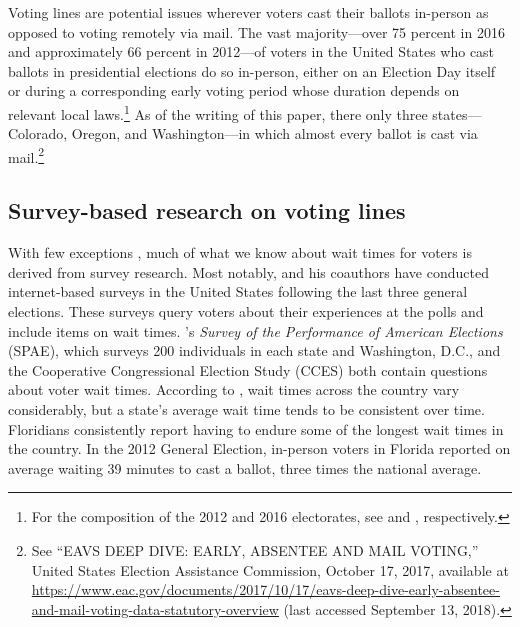 \documentclass[12pt,titlepage]{article}
\begin{document}
Voting lines are potential issues wherever voters cast their ballots
in-person as opposed to voting remotely via mail.  The vast
majority---over 75 percent in 2016 and approximately 66 percent in
2012---of voters in the United States who cast ballots in presidential
elections do so in-person, either on an Election Day itself or during
a corresponding early voting period whose duration depends on relevant
local laws.\footnote{For the composition of the 2012 and 2016
  electorates, see \citet{eac:2012} and \citet{eac:2016},
  respectively.}  As of the writing of this paper, there only three
states---Colorado, Oregon, and Washington---in which almost every
ballot is cast via mail.\footnote{See ``EAVS DEEP DIVE: EARLY,
  ABSENTEE AND MAIL VOTING,'' United States Election Assistance
  Commission, October 17, 2017, available at
  \url{https://www.eac.gov/documents/2017/10/17/eavs-deep-dive-early-absentee-and-mail-voting-data-statutory-overview}
  (last accessed September 13, 2018).}


\subsection*{Survey-based research on voting lines}


With few exceptions \citep[e.g.,][]{spencermarkovits:renege,
  herronsmith:hanoverstudy, pettigrew:longlinesminorityprecincts},
much of what we know about wait times for voters is derived from
survey research.  Most notably, \citet{stewart:waitingtovote2012} and
his coauthors have conducted internet-based surveys in the United
States following the last three general elections.  These surveys
query voters about their experiences at the polls and include items on
wait times.  \citeauthor{stewart:waitingtovote2012}'s \emph{Survey of
  the Performance of American Elections} (SPAE), which surveys 200
individuals in each state and Washington, D.C., and the Cooperative
Congressional Election Study (CCES) both contain questions about voter
wait times.  According to \citeauthor{stewart:waitingtovote2012}, wait
times across the country vary considerably, but a state's average wait
time tends to be consistent over time. Floridians consistently report
having to endure some of the longest wait times in the country.  In
the 2012 General Election, in-person voters in Florida reported on
average waiting 39 minutes to cast a ballot, three times the national
average.
\end{document}
